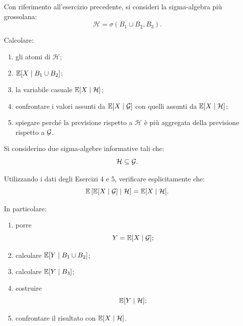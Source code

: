 \begin{exercise}
\label{ex:cap3-prop-informazione-fine-grossolana}

Con riferimento all'esercizio precedente, si consideri la sigma-algebra pi\`{u}
grossolana:
\[
\mathcal{H}
=
\sigma(B_1\cup B_2,B_3).
\]

Calcolare:

\begin{enumerate}
    \item gli atomi di $\mathcal{H}$;

    \item $\mathbb{E}[X\mid B_1\cup B_2]$;

    \item la variabile casuale $\mathbb{E}[X\mid\mathcal{H}]$;

    \item confrontare i valori assunti da
    $\mathbb{E}[X\mid\mathcal{G}]$ con quelli assunti da
    $\mathbb{E}[X\mid\mathcal{H}]$;

    \item spiegare perch\'{e} la previsione rispetto a $\mathcal{H}$ \`{e}
    pi\`{u} aggregata della previsione rispetto a $\mathcal{G}$.
\end{enumerate}

\end{exercise}

\begin{exercise}
\label{ex:cap3-prop-torre}

Si considerino due sigma-algebre informative tali che:
\[
\mathcal{H}\subseteq\mathcal{G}.
\]

Utilizzando i dati degli Esercizi 4 e 5, verificare esplicitamente che:
\[
\mathbb{E}\left[
\mathbb{E}[X\mid\mathcal{G}]
\mid
\mathcal{H}
\right]
=
\mathbb{E}[X\mid\mathcal{H}].
\]

In particolare:

\begin{enumerate}
    \item porre
    \[
    Y=\mathbb{E}[X\mid\mathcal{G}];
    \]

    \item calcolare $\mathbb{E}[Y\mid B_1\cup B_2]$;

    \item calcolare $\mathbb{E}[Y\mid B_3]$;

    \item costruire
    \[
    \mathbb{E}[Y\mid\mathcal{H}];
    \]

    \item confrontare il risultato con $\mathbb{E}[X\mid\mathcal{H}]$.
\end{enumerate}

\end{exercise}

